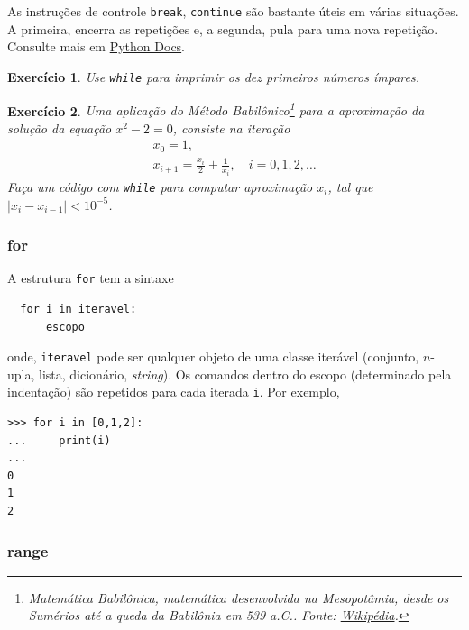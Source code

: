 \documentclass[12pt]{article}
\newtheorem{exr}{Exercício}[section]
\begin{document}
\begin{obs}
  As instruções de controle \lstinline+break+, \lstinline+continue+ são bastante úteis em várias situações. A primeira, encerra as repetições e, a segunda, pula para uma nova repetição. Consulte mais em \href{https://docs.python.org/3/tutorial/controlflow.html\#break-and-continue-statements-and-else-clauses-on-loops}{Python Docs}.
\end{obs}

\begin{exr}
  Use \lstinline+while+ para imprimir os dez primeiros números ímpares.
\end{exr}

\begin{exr}
  Uma aplicação do Método Babilônico\footnote{Matemática Babilônica, matemática desenvolvida na Mesopotâmia, desde os Sumérios até a queda da Babilônia em 539 a.C.. Fonte: \href{https://pt.wikipedia.org/wiki/Matem\%C3\%A1tica\_babil\%C3\%B4nica}{Wikipédia}.} para a aproximação da solução da equação $x^2-2 = 0$, consiste na iteração
  \begin{gather}
    x_0 = 1,\\
    x_{i+1} = \frac{x_i}{2} + \frac{1}{x_i},\quad i=0,1,2,\ldots
  \end{gather}
  Faça um código com \lstinline+while+ para computar aproximação $x_{i}$, tal que $|x_{i}-x_{i-1}|<10^{-5}$.
\end{exr}

\subsubsection{for}

A estrutura \lstinline+for+ tem a sintaxe
\begin{lstlisting}
  for i in iteravel:
      escopo
\end{lstlisting}
onde, \lstinline+iteravel+ pode ser qualquer objeto de uma classe iterável (conjunto, $n$-upla, lista, dicionário, {\it string}). Os comandos dentro do escopo (determinado pela indentação) são repetidos para cada iterada \lstinline+i+. Por exemplo,
\begin{lstlisting}
>>> for i in [0,1,2]:
...     print(i)
... 
0
1
2
\end{lstlisting}

\subsubsection{range}
\end{document}
